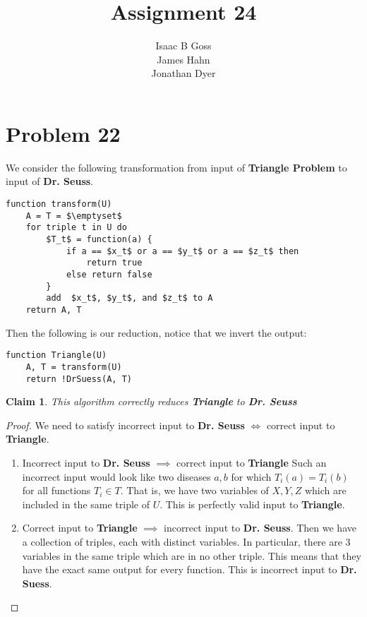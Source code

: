 \documentclass{article}
\author{Isaac B Goss\\ James Hahn\\ Jonathan Dyer}
\title{Assignment 24}
\newtheorem{thm}{Claim}
\providecommand{\prob}[1]{\section*{Problem #1}}
\begin{document}
\maketitle

    \prob{22}
    We consider the following transformation from input of \textbf{Triangle Problem} to input of \textbf{Dr. Seuss}.
    \begin{lstlisting}
function transform(U)
    A = T = $\emptyset$
    for triple t in U do
        $T_t$ = function(a) {
            if a == $x_t$ or a == $y_t$ or a == $z_t$ then
                return true
            else return false
        }
        add  $x_t$, $y_t$, and $z_t$ to A
    return A, T
    \end{lstlisting}

Then the following is our reduction, notice that we invert the output:
\begin{lstlisting}
function Triangle(U)
    A, T = transform(U)
    return !DrSuess(A, T)
\end{lstlisting}

\begin{thm}
    This algorithm correctly reduces \textbf{Triangle} to \textbf{Dr. Seuss}
\end{thm}
\begin{proof} We need to satisfy incorrect input to  \textbf{Dr. Seuss} $\iff$ correct input to \textbf{Triangle}.
    
    \begin{enumerate}
        \item Incorrect input to \textbf{Dr. Seuss} $\implies$ correct input to \textbf{Triangle}
        Such an incorrect input would look like two diseases $a, b$ for which $T_i(a) = T_i(b)$ for all functions $T_i \in T$.
        That is, we have two variables of $X,Y,Z$ which are included in the same triple of $U$.
        This is perfectly valid input to \textbf{Triangle}.

        \item Correct input to \textbf{Triangle} $\implies$ incorrect input to \textbf{Dr. Seuss}.
        Then we have a collection of triples, each with distinct variables.
        In particular, there are 3 variables in the same triple which are in no other triple.
        This means that they have the exact same output for every function.
        This is incorrect input to \textbf{Dr. Suess}.
    \end{enumerate}
\end{proof}
\end{document}
